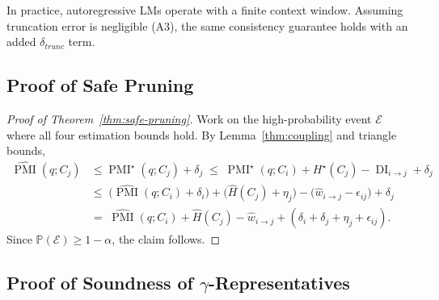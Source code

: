 \documentclass{article} %
\theoremstyle{definition}
\newcommand{\PP}{\mathbb{P}}
\DeclareMathOperator{\DI}{DI}
\DeclareMathOperator{\PMI}{PMI}
\begin{document}
In practice, autoregressive LMs operate with a finite context window. Assuming truncation error is negligible (A3), the same consistency guarantee holds with an added $\delta_{trunc}$ term.

\subsection{Proof of Safe Pruning}\label{sec:proof-safe-pruning}

\begin{proof}[Proof of Theorem~\ref{thm:safe-pruning}]
Work on the high-probability event $\mathcal{E}$ where all four estimation bounds hold. By Lemma~\ref{thm:coupling} and triangle bounds,
\begin{align*}
\widehat{\PMI}(q;C_j)
&\le \PMI^\star(q;C_j)+\delta_j
\;\le\; \PMI^\star(q;C_i)+H^\star(C_j)-\DI_{i\to j} + \delta_j \\
&\le\; \big(\widehat{\PMI}(q;C_i)+\delta_i\big) + \big(\hat{H}(C_j)+\eta_j\big) - \big(\hat{w}_{i\to j}-\epsilon_{ij}\big) + \delta_j \\
&=\; \widehat{\PMI}(q;C_i) + \hat{H}(C_j) - \hat{w}_{i\to j} + (\delta_i+\delta_j+\eta_j+\epsilon_{ij}).
\end{align*}
Since $\PP(\mathcal{E})\ge 1-\alpha$, the claim follows.
\end{proof}

\subsection{Proof of Soundness of $\gamma$-Representatives}\label{sec:proof-soundness}
\end{document}
